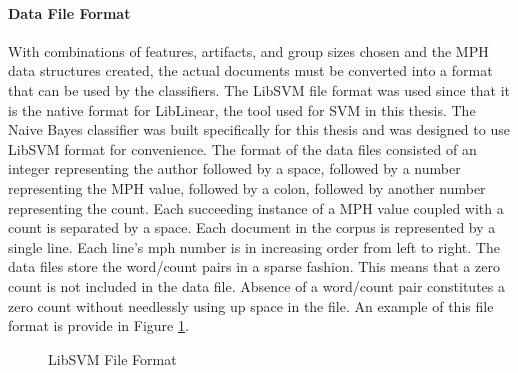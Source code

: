 		\paragraph{Data File Format}With combinations of features, artifacts, and group sizes chosen and the MPH data structures created, the actual documents must be converted into a format that can be used by the classifiers. The LibSVM file format was used since that it is the native format for LibLinear, the tool used for SVM in this thesis.  The Naive Bayes classifier was built specifically for this thesis and was designed to use LibSVM format for convenience. The format of the data files consisted of an integer representing the author followed by a space, followed by a number representing the MPH value, followed by a colon, followed by another number representing the count.  Each succeeding instance of a MPH value coupled with a count is separated by a space.  Each document in the corpus is represented by a single line.  Each line's mph number is in increasing order from left to right.  The data files store the word/count pairs in a sparse fashion.  This means that a zero count is not included in the data file.  Absence of a word/count pair constitutes a zero count without needlessly using up space in the file.  An example of this file format is provide in Figure \ref{fig:svmFormat}.
		\begin{figure}[ht!]
			\begin{center}
				\caption{LibSVM File Format}
				\label{fig:svmFormat}
			\end{center}
		\end{figure}
	
